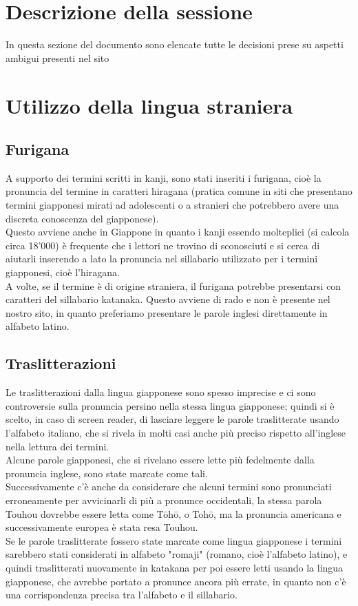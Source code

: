 \documentclass[openany, a4paper, 12pt]{report}
\begin{document}
		\section{Descrizione della sessione}
			In questa sezione del documento sono elencate tutte le decisioni prese su aspetti ambigui presenti nel sito\\
		\section{Utilizzo della lingua straniera}
			\subsection{Furigana}
				A supporto dei termini scritti in kanji, sono stati inseriti i furigana, cioè la pronuncia del termine in caratteri hiragana (pratica comune in siti che presentano termini giapponesi mirati ad adolescenti o a stranieri che potrebbero avere una discreta conoscenza del giapponese).\\
				Questo avviene anche in Giappone in quanto i kanji essendo molteplici (si calcola circa 18'000) è frequente che i lettori ne trovino di sconosciuti e si cerca di aiutarli inserendo a lato la pronuncia nel sillabario utilizzato per i termini giapponesi, cioè l'hiragana.\\
				A volte, se il termine è di origine straniera, il furigana potrebbe presentarsi con caratteri del sillabario katanaka. Questo avviene di rado e non è presente nel nostro sito, in quanto preferiamo presentare le parole inglesi direttamente in alfabeto latino.
			\subsection{Traslitterazioni}
				Le traslitterazioni dalla lingua giapponese sono spesso imprecise e ci sono controversie sulla pronuncia persino nella stessa lingua giapponese; quindi si è scelto, in caso di screen reader, di lasciare leggere le parole traslitterate usando l'alfabeto italiano, che si rivela in molti casi anche più preciso rispetto all'inglese nella lettura dei termini.\\
				Alcune parole giapponesi, che si rivelano essere lette più fedelmente dalla pronuncia inglese, sono state marcate come tali.\\
				Successivamente c'è anche da considerare che alcuni termini sono pronunciati erroneamente per avvicinarli di più a pronunce occidentali, la stessa parola Touhou dovrebbe essere letta come Tōhō, o Tohō, ma la pronuncia americana e successivamente europea è stata resa Touhou.\\
				Se le parole traslitterate fossero state marcate come lingua giapponese i termini sarebbero stati considerati in alfabeto "romaji" (romano, cioè l'alfabeto latino), e quindi traslitterati nuovamente in katakana per poi essere letti usando la lingua giapponese, che avrebbe portato a pronunce ancora più errate, in quanto non c'è una corrispondenza precisa tra l'alfabeto e il sillabario.
				
\end{document}
